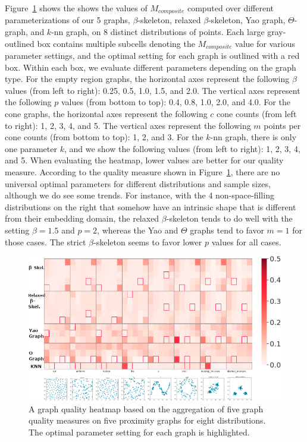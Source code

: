 Figure~\ref{fig:teaser} shows the shows the values of $M_{composite}$ computed over different parameterizations of our 5 graphs, $\beta$-skeleton, relaxed $\beta$-skeleton, Yao graph, $\Theta$-graph, and $k$-nn graph, on 8 distinct distributions of points.
%
Each large gray-outlined box contains multiple subcells denoting the $M_{composite}$ value for various parameter settings, and the optimal setting for each graph is outlined with a red box.
%
Within each box, we evaluate different parameters depending on the graph type.
%
For the empty region graphs, the horizontal axes represent the following $\beta$ values (from left to right): 0.25, 0.5, 1.0, 1.5, and 2.0.
%
The vertical axes represent the following $p$ values (from bottom to top): 0.4, 0.8, 1.0, 2.0, and 4.0.
%
For the cone graphs, the horizontal axes represent the following $c$ cone counts (from left to right): 1, 2, 3, 4, and 5.
%
The vertical axes represent the following $m$ points per cone counts (from bottom to top): 1, 2, and 3.
%
For the $k$-nn graph, there is only one parameter $k$, and we show the following values (from left to right): 1, 2, 3, 4, and 5.
%
When evaluating the heatmap, lower values are better for our quality measure.
%
According to the quality measure shown in Figure~\ref{fig:teaser}, there are no universal optimal parameters for different distributions and sample sizes, although we do see some trends.
%
For instance, with the 4 non-space-filling distributions on the right that somehow have an intrinsic shape that is different from their embedding domain, the relaxed $\beta$-skeleton tends to do well with the setting $\beta=1.5$ and $p=2$, whereas the Yao and $\Theta$ graphs tend to favor $m=1$ for those cases.
%
The strict $\beta$-skeleton seems to favor lower $p$ values for all cases.

\begin{figure}[htbp]
    \includegraphics[width=\linewidth]{figs/chap7/Combined5graphs.png}
    \caption[Heatmaps for identifying optimal graph quality]{A graph quality heatmap based on the aggregation of five graph quality measures on five proximity graphs for eight distributions.
    The optimal parameter setting for each graph is highlighted.}
    \label{fig:teaser}
\end{figure}

